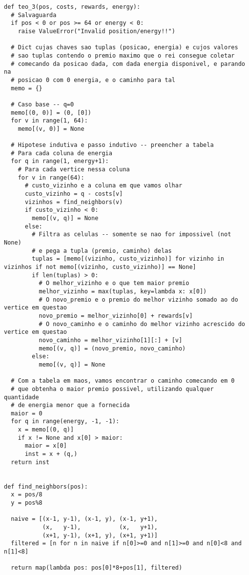 \documentclass{article}
\begin{document}
{\color{red}
\begin{verbatim}
def teo_3(pos, costs, rewards, energy):
  # Salvaguarda
  if pos < 0 or pos >= 64 or energy < 0:
    raise ValueError("Invalid position/energy!!")

  # Dict cujas chaves sao tuplas (posicao, energia) e cujos valores
  # sao tuplas contendo o premio maximo que o rei consegue coletar
  # comecando da posicao dada, com dada energia disponivel, e parando na
  # posicao 0 com 0 energia, e o caminho para tal
  memo = {}

  # Caso base -- q=0
  memo[(0, 0)] = (0, [0])
  for v in range(1, 64):
    memo[(v, 0)] = None

  # Hipotese indutiva e passo indutivo -- preencher a tabela
  # Para cada coluna de energia
  for q in range(1, energy+1):
    # Para cada vertice nessa coluna
    for v in range(64):
      # custo_vizinho e a coluna em que vamos olhar
      custo_vizinho = q - costs[v]
      vizinhos = find_neighbors(v)
      if custo_vizinho < 0:
        memo[(v, q)] = None
      else:
        # Filtra as celulas -- somente se nao for impossivel (not None)
        # e pega a tupla (premio, caminho) delas
        tuplas = [memo[(vizinho, custo_vizinho)] for vizinho in vizinhos if not memo[(vizinho, custo_vizinho)] == None]
        if len(tuplas) > 0:
          # O melhor_vizinho e o que tem maior premio
          melhor_vizinho = max(tuplas, key=lambda x: x[0])
          # O novo_premio e o premio do melhor vizinho somado ao do vertice em questao
          novo_premio = melhor_vizinho[0] + rewards[v]
          # O novo_caminho e o caminho do melhor vizinho acrescido do vertice em questao
          novo_caminho = melhor_vizinho[1][:] + [v]
          memo[(v, q)] = (novo_premio, novo_caminho)
        else:
          memo[(v, q)] = None

  # Com a tabela em maos, vamos encontrar o caminho comecando em 0
  # que obtenha o maior premio possivel, utilizando qualquer quantidade
  # de energia menor que a fornecida
  maior = 0
  for q in range(energy, -1, -1):
    x = memo[(0, q)]
    if x != None and x[0] > maior:
      maior = x[0]
      inst = x + (q,)
  return inst


def find_neighbors(pos):
  x = pos/8
  y = pos%8

  naive = [(x-1, y-1), (x-1, y), (x-1, y+1),
           (x,   y-1),           (x,   y+1),
           (x+1, y-1), (x+1, y), (x+1, y+1)]
  filtered = [n for n in naive if n[0]>=0 and n[1]>=0 and n[0]<8 and n[1]<8]

  return map(lambda pos: pos[0]*8+pos[1], filtered)
\end{verbatim}
}
\end{document}
